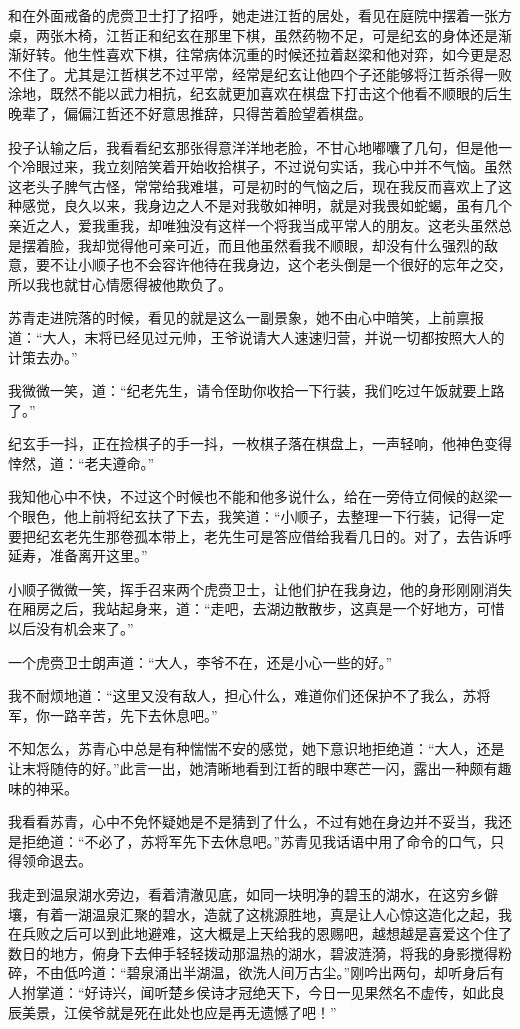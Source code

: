 和在外面戒备的虎赍卫士打了招呼，她走进江哲的居处，看见在庭院中摆着一张方桌，两张木椅，江哲正和纪玄在那里下棋，虽然药物不足，可是纪玄的身体还是渐渐好转。他生性喜欢下棋，往常病体沉重的时候还拉着赵梁和他对弈，如今更是忍不住了。尤其是江哲棋艺不过平常，经常是纪玄让他四个子还能够将江哲杀得一败涂地，既然不能以武力相抗，纪玄就更加喜欢在棋盘下打击这个他看不顺眼的后生晚辈了，偏偏江哲还不好意思推辞，只得苦着脸望着棋盘。

投子认输之后，我看看纪玄那张得意洋洋地老脸，不甘心地嘟囔了几句，但是他一个冷眼过来，我立刻陪笑着开始收拾棋子，不过说句实话，我心中并不气恼。虽然这老头子脾气古怪，常常给我难堪，可是初时的气恼之后，现在我反而喜欢上了这种感觉，良久以来，我身边之人不是对我敬如神明，就是对我畏如蛇蝎，虽有几个亲近之人，爱我重我，却唯独没有这样一个将我当成平常人的朋友。这老头虽然总是摆着脸，我却觉得他可亲可近，而且他虽然看我不顺眼，却没有什么强烈的敌意，要不让小顺子也不会容许他待在我身边，这个老头倒是一个很好的忘年之交，所以我也就甘心情愿得被他欺负了。

苏青走进院落的时候，看见的就是这么一副景象，她不由心中暗笑，上前禀报道：“大人，末将已经见过元帅，王爷说请大人速速归营，并说一切都按照大人的计策去办。”

我微微一笑，道：“纪老先生，请令侄助你收拾一下行装，我们吃过午饭就要上路了。”

纪玄手一抖，正在捡棋子的手一抖，一枚棋子落在棋盘上，一声轻响，他神色变得悻然，道：“老夫遵命。”

我知他心中不快，不过这个时候也不能和他多说什么，给在一旁侍立伺候的赵梁一个眼色，他上前将纪玄扶了下去，我笑道：“小顺子，去整理一下行装，记得一定要把纪玄老先生那卷孤本带上，老先生可是答应借给我看几日的。对了，去告诉呼延寿，准备离开这里。”

小顺子微微一笑，挥手召来两个虎赍卫士，让他们护在我身边，他的身形刚刚消失在厢房之后，我站起身来，道：“走吧，去湖边散散步，这真是一个好地方，可惜以后没有机会来了。”

一个虎赍卫士朗声道：“大人，李爷不在，还是小心一些的好。”

我不耐烦地道：“这里又没有敌人，担心什么，难道你们还保护不了我么，苏将军，你一路辛苦，先下去休息吧。”

不知怎么，苏青心中总是有种惴惴不安的感觉，她下意识地拒绝道：“大人，还是让末将随侍的好。”此言一出，她清晰地看到江哲的眼中寒芒一闪，露出一种颇有趣味的神采。

我看看苏青，心中不免怀疑她是不是猜到了什么，不过有她在身边并不妥当，我还是拒绝道：“不必了，苏将军先下去休息吧。”苏青见我话语中用了命令的口气，只得领命退去。

我走到温泉湖水旁边，看着清澈见底，如同一块明净的碧玉的湖水，在这穷乡僻壤，有着一湖温泉汇聚的碧水，造就了这桃源胜地，真是让人心惊这造化之起，我在兵败之后可以到此地避难，这大概是上天给我的恩赐吧，越想越是喜爱这个住了数日的地方，俯身下去伸手轻轻拨动那温热的湖水，碧波涟漪，将我的身影搅得粉碎，不由低吟道：“碧泉涌出半湖温，欲洗人间万古尘。”刚吟出两句，却听身后有人拊掌道：“好诗兴，闻听楚乡侯诗才冠绝天下，今日一见果然名不虚传，如此良辰美景，江侯爷就是死在此处也应是再无遗憾了吧！”

